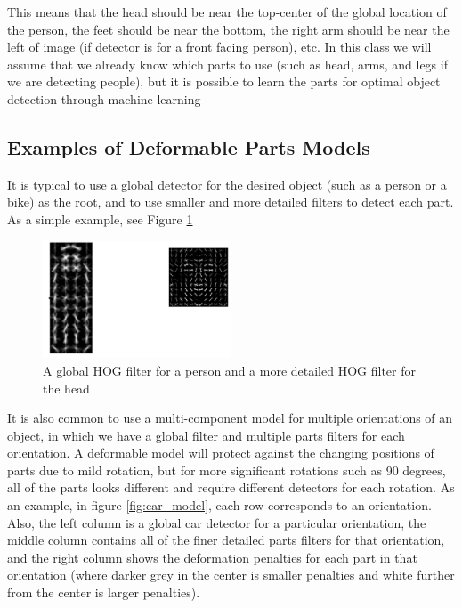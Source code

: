 \documentclass{article}
\begin{document}
This means that
the head should be near the top-center of the global location of the person, the
feet should be near the bottom, the right arm should be near the left of image 
(if detector is for a front facing person), etc. In this class we will assume that we 
already know which parts to use (such as head,
arms, and legs if we are detecting people), but it is possible to learn the parts for
optimal object detection through machine learning\\

\subsection{Examples of Deformable Parts Models}
It is typical to use a global detector for the desired object (such as a person or
a bike) as the root, and to use smaller and more detailed filters to detect each
part. As a simple example, see Figure \ref{fig:deformable_head_filter}\\

\begin{figure}[h]
	\center
	\includegraphics[width=0.5\textwidth]{deformable_head_filter.png}
    \caption{A global HOG filter for a person and a more detailed HOG filter for the 
    head}
    \label{fig:deformable_head_filter}
\end{figure}



It is also common to use a multi-component model for multiple orientations
of an object, in which we have a global filter and multiple parts filters for each
orientation. A deformable model will protect against the changing positions of parts
due to mild rotation, but for more significant rotations such as 90 degrees, all of
the parts looks different and require different detectors for each rotation. 
As an example, in figure
\ref{fig:car_model}, each row corresponds to an orientation. Also, the left column is a
global car detector for a particular orientation, the middle column contains all of the 
finer detailed parts filters for that orientation, and the right column shows the deformation penalties for
each part in that orientation (where darker grey in the center is smaller penalties and white further from
the center is larger penalties).\\
\end{document}
